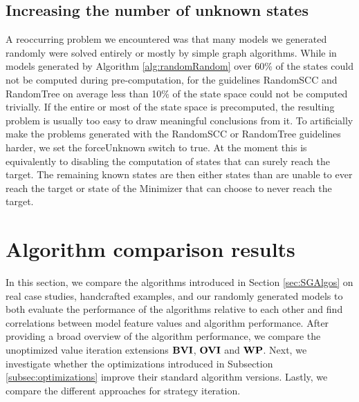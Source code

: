 \subsection{Increasing the number of unknown states}
A reoccurring problem we encountered was that many models we generated randomly were solved entirely or mostly by simple graph algorithms.
While in models generated by Algorithm \ref{alg:randomRandom} over 60\% of the states could not be computed during pre-computation, 
for the guidelines RandomSCC and RandomTree on average less than 10\% of the state space could not be computed trivially.
If the entire or most of the state space is precomputed, the resulting problem is usually too easy to draw meaningful conclusions from it.
To artificially make the problems generated with the RandomSCC or RandomTree guidelines harder, we set the forceUnknown switch to true. 
At the moment this is equivalently to disabling the computation of 
states that can surely reach the target.
The remaining known states are then either states than are unable to ever reach the target or state of the Minimizer that can choose to never reach the target.

\section{Algorithm comparison results}
In this section, we compare the algorithms introduced in Section \ref{sec:SGAlgos} on real case studies, handcrafted examples, and our randomly generated models to both evaluate the 
performance of the algorithms relative to each other and find correlations between model feature values and algorithm performance.
After providing a broad overview of the algorithm performance, we compare the unoptimized value iteration extensions $\mathbf{BVI}$, $\mathbf{OVI}$ and $\mathbf{WP}$.
Next, we investigate whether the optimizations introduced in Subsection \ref{subsec:optimizations} improve their standard algorithm versions. Lastly, we compare the different approaches for strategy iteration. 

